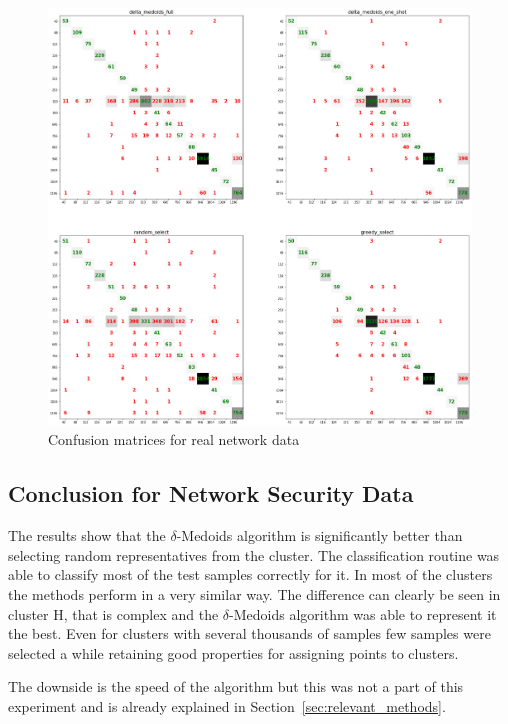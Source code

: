 \documentclass[thesis=B,english]{FITthesis}[2012/10/20]
\begin{document}
\begin{figure}[t]
   \includegraphics[width=\linewidth]{img/exp4.png}
  \caption{Confusion matrices for real network data}
  \label{img:exp4}
\end{figure}


\subsection{Conclusion for Network Security Data}
The results show that the $\delta$-Medoids algorithm is significantly better than selecting random representatives from the cluster.
The classification routine was able to classify most of the test samples correctly for it.
In most of the clusters the methods perform in a very similar way.
The difference can clearly be seen in cluster H, that is complex and the $\delta$-Medoids algorithm was able to represent it the best.
Even for clusters with several thousands of samples few samples were selected a while retaining good properties for assigning points to clusters.

The downside is the speed of the algorithm but this was not a part of this experiment and is already explained in Section~\ref{sec:relevant_methods}.

\end{document}
